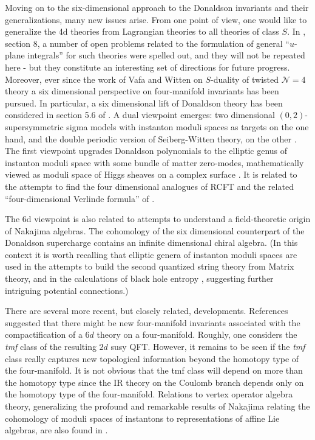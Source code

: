\documentclass[12pt]{article}
\newcommand\CalN{\mathcal{N}}
\begin{document}
Moving on to the six-dimensional approach to the   Donaldson invariants 
and their generalizations, many new issues arise.   From one point of view, one would like 
to generalize the 4d theories from Lagrangian theories to all theories of class $S$. 
In \cite{Manschot:2021qqe}, section $8$, a number of open problems related to the formulation of general ``$u$-plane integrals'' for such theories  were spelled out, 
and they will not be repeated here - but they constitute an interesting set of directions for future progress.  Moreover, ever since the work of Vafa and Witten on $S$-duality of twisted ${\CalN}=4$ theory \cite{Vafa:1994tf}  a six dimensional perspective on four-manifold invariants has been pursued.  In particular, a six dimensional lift of Donaldson theory has been considered in section 5.6 of \cite{NikThesis}. A dual viewpoint emerges:  two dimensional $(0,2)$-supersymmetric sigma models with instanton moduli spaces as targets on the one hand, and the double periodic version of Seiberg-Witten theory, on the other \cite{NikFive, HIV:2003, BH:2003}. The first viewpoint upgrades Donaldson polynomials to the
elliptic genus of instanton moduli space with some bundle of matter zero-modes, mathematically viewed as moduli space of Higgs sheaves on a complex surface \cite{Gottsche:2019vbi}. It is related to the attempts to
find the four dimensional analogues of RCFT and the related ``four-dimensional Verlinde formula'' of \cite{Avatars}.


{}The 6d viewpoint is also related to attempts to understand a 
field-theoretic origin of Nakajima algebras. 
The cohomology of the six dimensional counterpart of the Donaldson supercharge contains an infinite dimensional chiral algebra. 
(In this context it is worth recalling that elliptic genera of instanton moduli spaces are used
in the attempts to build the second quantized string theory from Matrix theory, 
and in the calculations of black hole entropy \cite{DMVV:1997}, suggesting 
further intriguing potential connections.) 



There are several more recent, but closely related, developments. References 
\cite{Dedushenko:2017tdw,Feigin:2018bkf,Gukov:2018iiq} suggested that there might be new four-manifold invariants associated
with the compactification of a $6d$ theory on a four-manifold. Roughly, one considers
the \emph{tmf} class of the resulting $2d$ susy QFT.
However, it remains to be seen if the \emph{tmf} class really captures new topological information beyond the homotopy type of the four-manifold. 
It is not obvious that the tmf class will depend on more than the homotopy type since the 
IR theory on the Coulomb branch depends only on the homotopy type of the four-manifold. 
Relations to vertex operator algebra theory, generalizing the profound and remarkable
results of Nakajima relating the cohomology of moduli spaces of instantons to
representations of affine Lie algebras, are also found in 
\cite{Dedushenko:2017tdw,Feigin:2018bkf,Gukov:2018iiq}.
\end{document}
